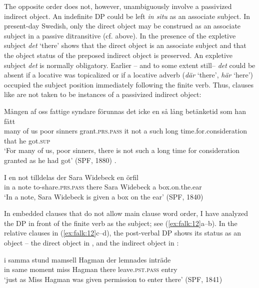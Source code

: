 \documentclass[output=paper]{langscibook}
\begin{document}
The opposite order does not, however, unambiguously involve a passivized indirect object. An indefinite DP could be left \textit{in situ} as an associate subject. In present-day Swedish, only the direct object may be construed as an associate subject in a passive ditransitive (cf.  above). In  the presence of {the expletive subject \textit{det} ‘there’} shows that the direct object is an associate subject and that the object status of the preposed indirect object is preserved. An expletive subject \textit{det} is normally obligatory. Earlier – and to some extent still– \textit{det} could be absent if a locative was topicalized or if a locative adverb (\textit{där} ‘there’, \textit{här} ‘here’) occupied the subject position immediately following the finite verb. Thus, clauses like  are not taken to be instances of a passivized indirect object:

\ea%
    \label{ex:falk:11}
\ea\label{ex:falk:11a}
\gll Mången  af  oss  fattige  syndare  förunnas      det  icke  en  så    lång  betänketid            som  han  fått\\
many    of  us    poor    sinners    grant\textsc{.prs}.\textsc{pass}     it    not  a  such  long      time.for.consideration  that  he    got\textsc{.sup}\footnotemark{}\\
\glt ‘For many of us, poor sinners, there is not such a long time for consideration granted as he had got’ (SPF, 1880)
.

\ex\label{ex:falk:11b}
\gll I  en  not  tilldelas            der  Sara  Widebeck  en  örfil\\
      in  a  note  to-share\textsc{.prs}.\textsc{pass}    there  Sara  Widebeck  a  box.on.the.ear\\
\glt ‘In a note, Sara Widebeck is given a box on the ear’ (SPF, 1840)
\z
\z


In embedded clauses that do not allow main clause word order, I have analyzed the DP in front of the finite verb as the subject; see (\ref{ex:falk:12}a–b). In the relative clauses in (\ref{ex:falk:12}c–d), the post-verbal DP shows its status as an object – the direct object in , and the indirect object in :

\ea%
    \label{ex:falk:12}
\ea\label{ex:falk:12a}
\gll i  samma  stund    mamsell  Hagman  der    lemnades      inträde\\
      in  same    moment miss    Hagman  there  leave\textsc{.pst}.\textsc{pass}     entry\\
\glt ‘just as Miss Hagman was given permission to enter there’ (SPF, 1841)
\end{document}
